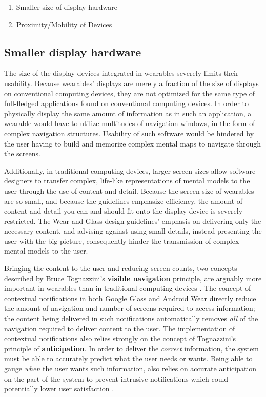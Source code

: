 \documentclass[12pt]{article}
\begin{document}
\begin{enumerate}
\item{Smaller size of display hardware}
\item{Proximity/Mobility of Devices}
\end{enumerate}

\subsection{Smaller display hardware}
The size of the display devices integrated in wearables severely limits their usability. Because wearables' displays are merely a fraction of the size of displays on conventional computing devices, they are not optimized for the same type of full-fledged applications found on conventional computing devices. In order to physically display the same amount of information as in such an application, a wearable would have to utilize multitudes of navigation windows, in the form of complex navigation structures. Usability of such software would be hindered by the user having to build and memorize complex mental maps to navigate through the screens.

Additionally, in traditional computing devices, larger screen sizes allow software designers to transfer complex, life-like representations of mental models to the user through the use of content and detail. Because the screen size of wearables are so small, and because the guidelines emphasize efficiency, the amount of content and detail you can and should fit onto the display device is severely restricted. The Wear and Glass design guidelines' emphasis on delivering only the necessary content, and advising against using small details, instead presenting the user with the big picture, consequently hinder the transmission of complex mental-models to the user.

Bringing the content to the user and reducing screen counts, two concepts described by Bruce Tognazzini's \textbf{visible navigation} principle, are arguably more important in wearables than in traditional computing devices \cite{tog}. The concept of contextual notifications in both Google Glass and Android Wear directly reduce the amount of navigation and number of screens required to access information; the content being delivered in such notifications automatically removes \textit{all} of the navigation required to deliver content to the user. The implementation of contextual notifications also relies strongly on the concept of Tognazzini's principle of \textbf{anticipation}. In order to deliver the \textit{correct} information, the system must be able to accurately predict what the user needs or wants. Being able to gauge \textit{when} the user wants such information, also relies on accurate anticipation on the part of the system to prevent intrusive notifications which could potentially lower user satisfaction \cite{tog}.
\end{document}
